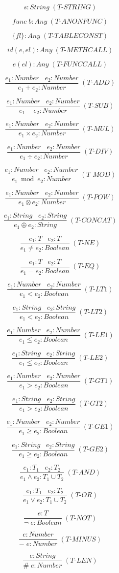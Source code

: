 \documentclass[12pt]{article}
\begin{document}
\[
s : String \; (\textit{T-STRING})
\]

\[
func \; b : Any \; (\textit{T-ANONFUNC})
\]

\[
\{fl\} : Any \; (\textit{T-TABLECONST})
\]

\[
id(e,el) : Any \; (\textit{T-METHCALL})
\]

\[
e(el) : Any \; (\textit{T-FUNCCALL})
\]

\[
\frac{e_{1}:Number \;\;\; e_{2}:Number}
     {e_{1} + e_{2} : Number} \; (\textit{T-ADD})
\]

\[
\frac{e_{1}:Number \;\;\; e_{2}:Number}
     {e_{1} - e_{2} : Number} \; (\textit{T-SUB})
\]

\[
\frac{e_{1}:Number \;\;\; e_{2}:Number}
     {e_{1} \times e_{2} : Number} \; (\textit{T-MUL})
\]

\[
\frac{e_{1}:Number \;\;\; e_{2}:Number}
     {e_{1} \div e_{2} : Number} \; (\textit{T-DIV})
\]

\[
\frac{e_{1}:Number \;\;\; e_{2}:Number}
     {e_{1} \bmod e_{2} : Number} \; (\textit{T-MOD})
\]

\[
\frac{e_{1}:Number \;\;\; e_{2}:Number}
     {e_{1} \otimes e_{2} : Number} \; (\textit{T-POW})
\]

\[
\frac{e_{1}:String \;\;\; e_{2}:String}
     {e_{1} \oplus e_{2} : String} \; (\textit{T-CONCAT})
\]

\[
\frac{e_{1}:T \;\;\; e_{2}:T}
     {e_{1} \not= e_{2} : Boolean} \; (\textit{T-NE})
\]

\[
\frac{e_{1}:T \;\;\; e_{2}:T}
     {e_{1} = e_{2} : Boolean} \; (\textit{T-EQ})
\]

\[
\frac{e_{1}:Number \;\;\; e_{2}:Number}
     {e_{1} < e_{2} : Boolean} \; (\textit{T-LT1})
\]

\[
\frac{e_{1}:String \;\;\; e_{2}:String}
     {e_{1} < e_{2} : Boolean} \; (\textit{T-LT2})
\]

\[
\frac{e_{1}:Number \;\;\; e_{2}:Number}
     {e_{1} \le e_{2} : Boolean} \; (\textit{T-LE1})
\]

\[
\frac{e_{1}:String \;\;\; e_{2}:String}
     {e_{1} \le e_{2} : Boolean} \; (\textit{T-LE2})
\]

\[
\frac{e_{1}:Number \;\;\; e_{2}:Number}
     {e_{1} > e_{2} : Boolean} \; (\textit{T-GT1})
\]

\[
\frac{e_{1}:String \;\;\; e_{2}:String}
     {e_{1} > e_{2} : Boolean} \; (\textit{T-GT2})
\]

\[
\frac{e_{1}:Number \;\;\; e_{2}:Number}
     {e_{1} \ge e_{2} : Boolean} \; (\textit{T-GE1})
\]

\[
\frac{e_{1}:String \;\;\; e_{2}:String}
     {e_{1} \ge e_{2} : Boolean} \; (\textit{T-GE2})
\]

\[
\frac{e_{1}:T_{1} \;\;\; e_{2}:T_{2}}
     {e_{1} \land e_{2} : T_{1} \cup T_{2}} \; (\textit{T-AND})
\]

\[
\frac{e_{1}:T_{1} \;\;\; e_{2}:T_{2}}
     {e_{1} \lor e_{2} : T_{1} \cup T_{2}} \; (\textit{T-OR})
\]

\[
\frac{e : T}
     {\lnot \; e : Boolean} \; (\textit{T-NOT})
\]

\[
\frac{e : Number}
     {- \; e : Number} \; (\textit{T-MINUS})
\]

\[
\frac{e : String}
     {\# \; e : Number} \; (\textit{T-LEN})
\]
\end{document}
